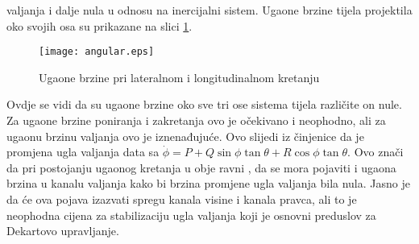 valjanja i dalje nula u odnosu na inercijalni sistem. Ugaone brzine tijela projektila oko 
svojih osa su prikazane na slici \ref{fig:angular}.
\begin{figure}[!ht]
    \centering
    \texttt{[image: angular.eps]}
    \caption{Ugaone brzine pri lateralnom i longitudinalnom kretanju}
    \label{fig:angular}
\end{figure}
Ovdje se vidi da su ugaone brzine oko sve tri ose sistema tijela različite on nule. 
Za ugaone brzine poniranja i zakretanja ovo je očekivano i neophodno, ali za ugaonu 
brzinu valjanja ovo je iznenađujuće. Ovo slijedi iz činjenice da je promjena ugla valjanja data sa 
$\dot{\phi} =P + Q\sin\phi\tan\theta + R\cos\phi\tan\theta$. Ovo znači da pri postojanju ugaonog kretanja u obje ravni
, da se mora pojaviti i ugaona brzina u kanalu valjanja kako bi brzina promjene ugla valjanja bila nula. 
Jasno je da će ova pojava izazvati spregu kanala visine i kanala pravca, ali to je neophodna 
cijena za stabilizaciju ugla valjanja koji je osnovni preduslov za Dekartovo upravljanje. 

